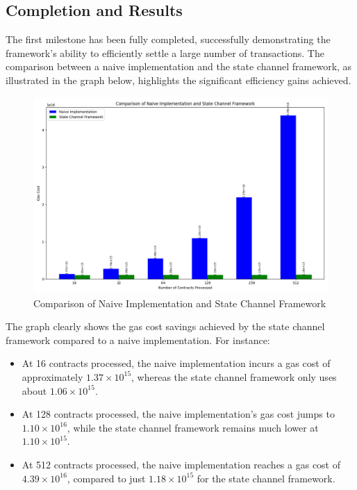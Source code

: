 \documentclass[11pt,a4paper]{article}
\begin{document}
\subsection*{Completion and Results}

The first milestone has been fully completed, successfully demonstrating the framework's ability to efficiently settle a large number of transactions. The comparison between a naive implementation and the state channel framework, as illustrated in the graph below, highlights the significant efficiency gains achieved.

\begin{figure}[h!]
    \centering
    \includegraphics[width=\textwidth]{images/state-channel-framework-bench.png}
    \caption{Comparison of Naive Implementation and State Channel Framework}
    \label{fig:comparison}
\end{figure}

The graph clearly shows the gas cost savings achieved by the state channel framework compared to a naive implementation. For instance:

\begin{itemize}
    \item At 16 contracts processed, the naive implementation incurs a gas cost of approximately $1.37 \times 10^{15}$, whereas the state channel framework only uses about $1.06 \times 10^{15}$.
    \item At 128 contracts processed, the naive implementation's gas cost jumps to $1.10 \times 10^{16}$, while the state channel framework remains much lower at $1.10 \times 10^{15}$.
    \item At 512 contracts processed, the naive implementation reaches a gas cost of $4.39 \times 10^{16}$, compared to just $1.18 \times 10^{15}$ for the state channel framework.
\end{itemize}
\end{document}
